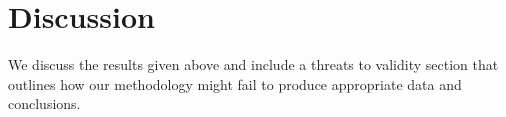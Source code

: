 
\chapter{Discussion}\label{chap:discussion}

We discuss the results given above and include a threats to validity section
that outlines how our methodology might fail to produce appropriate data and
conclusions.



